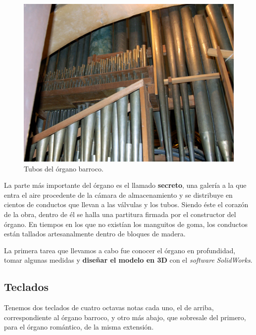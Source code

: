 \begin{figure}[H]
	\noindent \begin{centering}
		\includegraphics[width=\linewidth*3/4]{capitulo3/barroco}
		\par\end{centering}
	\smallskip
	\caption{\label{fig:barroco} Tubos del órgano barroco.}
\end{figure} 

\smallskip

La parte más importante del órgano es el llamado \textbf{secreto}, una galería a la que entra el aire procedente de la cámara de almacenamiento y se distribuye en cientos de conductos que llevan a las válvulas y los tubos. Siendo éste el corazón de la obra, dentro de él se halla una partitura firmada por el constructor del órgano. En tiempos en los que no existían los manguitos de goma, los conductos están tallados artesanalmente dentro de bloques de madera.

La primera tarea que llevamos a cabo fue conocer el órgano en profundidad, tomar algunas medidas y \textbf{diseñar el modelo en 3D} con el \textit{software} \textit{SolidWorks}.

\newpage
\subsection{Teclados}

Tenemos dos teclados de cuatro octavas notas cada uno, el de arriba, correspondiente al órgano barroco, y otro más abajo, que sobresale del primero, para el órgano romántico, de la misma extensión.

